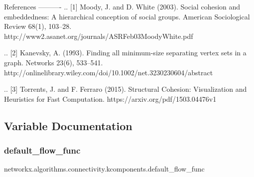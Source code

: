 \begin{DoxyVerb}
References
----------
.. [1]  Moody, J. and D. White (2003). Social cohesion and embeddedness:
        A hierarchical conception of social groups.
        American Sociological Review 68(1), 103--28.
        http://www2.asanet.org/journals/ASRFeb03MoodyWhite.pdf

.. [2]  Kanevsky, A. (1993). Finding all minimum-size separating vertex
        sets in a graph. Networks 23(6), 533--541.
        http://onlinelibrary.wiley.com/doi/10.1002/net.3230230604/abstract

.. [3]  Torrents, J. and F. Ferraro (2015). Structural Cohesion:
        Visualization and Heuristics for Fast Computation.
        https://arxiv.org/pdf/1503.04476v1\end{DoxyVerb}
 

\subsection{Variable Documentation}
\mbox{\label{namespacenetworkx_1_1algorithms_1_1connectivity_1_1kcomponents_ad7090c4be5ef6cba73ea7fd8089cde02}} 
\subsubsection{\texorpdfstring{default\+\_\+flow\+\_\+func}{default\_flow\_func}}
{\footnotesize\ttfamily networkx.\+algorithms.\+connectivity.\+kcomponents.\+default\+\_\+flow\+\_\+func}

